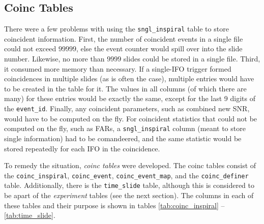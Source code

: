 \subsection{Coinc Tables}

There were a few problems with using the \texttt{sngl\_inspiral} table to store coincident information. First, the number of coincident events in a single file could not exceed $99999$, else the event counter would spill over into the slide number. Likewise, no more than $9999$ slides could be stored in a single file. Third, it consumed more memory than necessary. If a single-\ac{IFO} trigger formed coincidences in multiple slides (as is often the case), multiple entries would have to be created in the table for it. The values in all columns (of which there are many) for these entries would be exactly the same, except for the last 9 digits of the \texttt{event\_id}. Finally, any coincident parameters, such as combined new \ac{SNR}, would have to be computed on the fly. For coincident statistics that could not be computed on the fly, such as \acp{FAR}, a \texttt{sngl\_inspiral} column (meant to store single information) had to be comandeered, and the same statistic would be stored repeatedly for each \ac{IFO} in the coincidence.

To remedy the situation, \emph{coinc tables} were developed. The coinc tables consist of the \texttt{coinc\_inspiral}, \texttt{coinc\_event}, \texttt{coinc\_event\_map}, and the \texttt{coinc\_definer} table. Additionally, there is the \texttt{time\_slide} table, although this is considered to be apart of the \emph{experiment} tables (see the next section). The columns in each of these tables and their purpose is shown in tables \ref{tab:coinc_inspiral} -- \ref{tab:time_slide}.

